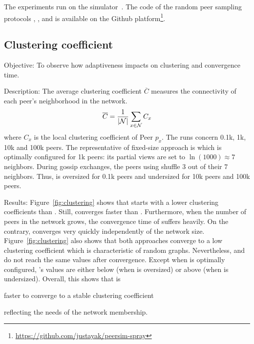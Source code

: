 The experiments run on the \PEERSIM
simulator~\cite{montresor2009peersim}. The code of the random peer sampling
protocols \CYCLON, \SCAMP, and \SPRAY is available on the Github
platform\footnote{\url{https://github.com/justayak/peersim-spray}}.

\subsection{Clustering coefficient}
\label{subsec:cluster}


\begin{asparadesc}
\item[Objective:] To observe how adaptiveness impacts on clustering and
  convergence time.
\item[Description:] The average clustering coefficient $\overline{C}$ measures
  the connectivity of each peer's neighborhood in the network.
  \begin{equation}
    \overline{C} = {1\over |\mathcal{N}|}\sum\limits_{x\in\mathcal{N}}C_x
  \end{equation}
  where $C_x$ is the local clustering coefficient of Peer $p_x$.  The
  runs concern 0.1k, 1k, 10k and 100k peers. The representative of
  fixed-size approach is \CYCLON which is optimally configured for 1k
  peers: its partial views are set to $\ln(1000)\approx 7$
  neighbors. During gossip exchanges, the peers using \CYCLON shuffle
  $3$ out of their $7$ neighbors. Thus, \CYCLON is oversized for 0.1k
  peers and undersized for 10k peers and 100k peers.
\item[Results:] Figure~\ref{fig:clustering} shows that \CYCLON starts
  with a lower clustering coefficients than \SPRAY. Still, \SPRAY
  converges faster than \CYCLON. Furthermore, when the number of peers
  in the network grows, the convergence time of \CYCLON suffers
  heavily. On the contrary, \SPRAY converges very quickly
  independently of the network size. Figure~\ref{fig:clustering} also
  shows that both approaches converge to a low clustering coefficient
  which is characteristic of random graphs. Nevertheless, \CYCLON and
  \SPRAY do not reach the same values after convergence. Except when
  \CYCLON is optimally configured, \SPRAY's values are either below
  (when \CYCLON is oversized) or above (when \CYCLON is undersized).
  Overall, this shows that \SPRAY is
  \begin{inparaenum}
  \item faster to converge to a stable clustering coefficient
  \item reflecting the needs of the network membership.

\end{inparaenum}
\end{asparadesc}
